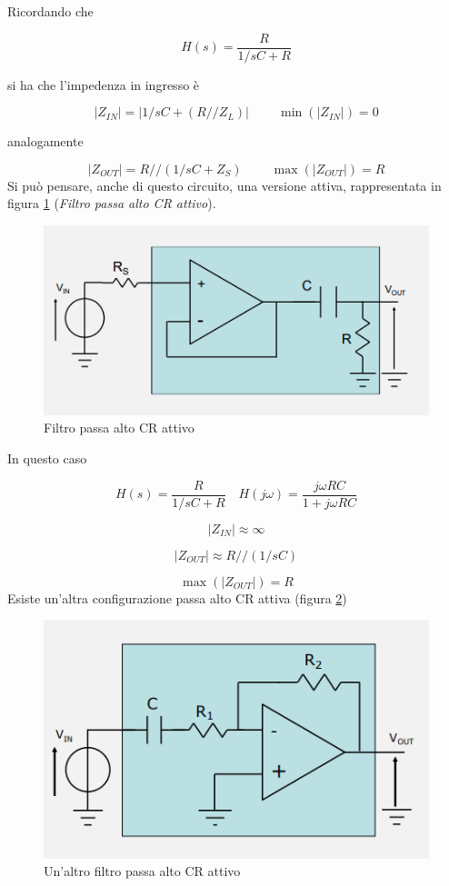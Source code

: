 \documentclass{article}
\begin{document}
Ricordando che

\[H(s) = \frac{R}{1/sC + R}\]

si ha che l'impedenza in ingresso è

\[|Z_{IN}|=|1/sC + (R // Z_L)| \;\;\;\;\;\;\;\; \min(|Z_{IN}|) = 0\]

analogamente

\[|Z_{OUT}|= R // (1/sC + Z_S) \;\;\;\;\;\;\;\; \max(|Z_{OUT}|) = R\]
\clearpage
Si può pensare, anche di questo circuito, una versione attiva, rappresentata in figura \ref{Schema_filtro_passa_alto_CR_attivo} (\textit{Filtro passa alto CR attivo}).

\begin{figure}[h]
  \centering
  \includegraphics[scale=0.6]{IM_filtro_passa_alto_CR_attivo}
  \caption{Filtro passa alto CR attivo}
  \label{Schema_filtro_passa_alto_CR_attivo}
\end{figure}

In questo caso 

\[H(s) = \frac{R}{1/sC + R} \quad H(j \omega) = \frac{j \omega RC}{1 + j \omega RC}\]

\[|Z_{IN}| \approx \infty\]

\[|Z_{OUT}| \approx R // (1/sC)\]

\[\max(|Z_{OUT}|) = R\]
\clearpage
Esiste un'altra configurazione passa alto CR attiva (figura \ref{Schema_filtro_passa_alto_CR_attivo_bis})

\begin{figure}[h]
  \centering
  \includegraphics[scale=0.5]{IM_filtro_passa_alto_CR_attivo_bis}
  \caption{Un'altro filtro passa alto CR attivo}
  \label{Schema_filtro_passa_alto_CR_attivo_bis}
\end{figure}
\end{document}
